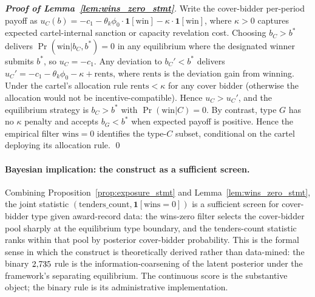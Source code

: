 \begin{proof}[\textbf{Proof of Lemma~\ref{lem:wins_zero_stmt}}]
Write the cover-bidder per-period payoff as
$u_C(b) = -c_1 - \theta_k\phi_0 \cdot \mathbf{1}[\text{win}]
       - \kappa\cdot\mathbf{1}[\text{win}]$, where $\kappa>0$
captures expected cartel-internal sanction or capacity
revelation cost. Choosing $b_C > b^*$ delivers
$\Pr(\text{win}|b_C, b^*) = 0$ in any equilibrium where the
designated winner submits $b^*$, so $u_C = -c_1$. Any deviation
to $b_C' < b^*$ delivers $u_C' = -c_1 - \theta_k\phi_0 - \kappa
+ \mathrm{rents}$, where $\mathrm{rents}$ is the deviation gain
from winning. Under the cartel's allocation rule
$\mathrm{rents} < \kappa$ for any cover bidder (otherwise the
allocation would not be incentive-compatible). Hence
$u_C > u_C'$, and the equilibrium strategy is $b_C > b^*$ with
$\Pr(\text{win}|C) = 0$. By contrast, type $G$ has no $\kappa$
penalty and accepts $b_G < b^*$ when expected payoff is
positive. Hence the empirical filter $\text{wins} = 0$
identifies the type-$C$ subset, conditional on the cartel
deploying its allocation rule. \qed
\end{proof}

\paragraph{Bayesian implication: the construct as a sufficient screen.}
Combining Proposition~\ref{prop:exposure_stmt} and
Lemma~\ref{lem:wins_zero_stmt}, the joint statistic
$(\text{tenders\_count}, \mathbf{1}[\text{wins}=0])$ is a
sufficient screen for cover-bidder type given award-record
data: the wins-zero filter selects the cover-bidder pool sharply
at the equilibrium type boundary, and the tenders-count statistic
ranks within that pool by posterior cover-bidder probability.
This is the formal sense in which the construct is theoretically
derived rather than data-mined: the binary $2{,}735$ rule is the
information-coarsening of the latent posterior under the
framework's separating equilibrium. The continuous score is the
substantive object; the binary rule is its administrative
implementation.


